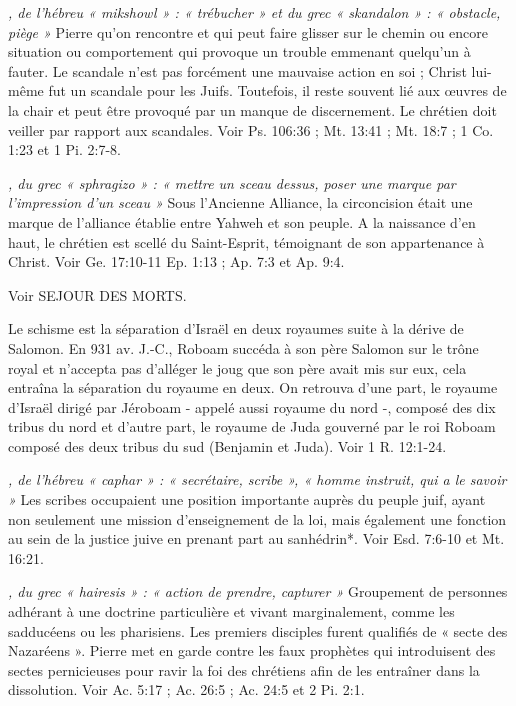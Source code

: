 \begin{multicols}{2}
\textit{, de l'hébreu « mikshowl » : « trébucher » et du grec « skandalon » : « obstacle, piège »}\newline
Pierre qu'on rencontre et qui peut faire glisser sur le chemin ou encore situation ou comportement qui provoque un trouble emmenant quelqu'un à fauter. Le scandale n'est pas forcément une mauvaise action en soi ; Christ lui-même fut un scandale pour les Juifs. Toutefois, il reste souvent lié aux œuvres de la chair et peut être provoqué par un manque de discernement. Le chrétien doit veiller par rapport aux scandales. Voir Ps. 106:36 ; Mt. 13:41 ; Mt. 18:7 ; 1 Co. 1:23 et 1 Pi. 2:7-8.

\textit{, du grec « sphragizo » : « mettre un sceau dessus, poser une marque par l'impression d'un sceau »}\newline
Sous l'Ancienne Alliance, la circoncision était une marque de l'alliance établie entre Yahweh et son peuple. A la naissance d'en haut, le chrétien est scellé du Saint-Esprit, témoignant de son appartenance à Christ. Voir Ge. 17:10-11 Ep. 1:13 ; Ap. 7:3 et Ap. 9:4.

\textit{}\newline
Voir SEJOUR DES MORTS.

\textit{}\newline
Le schisme est la séparation d'Israël en deux royaumes suite à la dérive de Salomon. En 931 av. J.-C., Roboam succéda à son père Salomon sur le trône royal et n'accepta pas d'alléger le joug que son père avait mis sur eux, cela entraîna la séparation du royaume en deux. On retrouva d'une part, le royaume d'Israël dirigé par Jéroboam - appelé aussi royaume du nord -, composé des dix tribus du nord et d'autre part, le royaume de Juda gouverné par le roi Roboam composé des deux tribus du sud (Benjamin et Juda). Voir 1 R. 12:1-24.

\textit{, de l'hébreu « caphar » : « secrétaire, scribe », « homme instruit, qui a le savoir »}\newline
Les scribes occupaient une position importante auprès du peuple juif, ayant non seulement une mission d'enseignement de la loi, mais également une fonction au sein de la justice juive en prenant part au sanhédrin*. Voir Esd. 7:6-10 et Mt. 16:21.

\textit{, du grec « hairesis » : « action de prendre, capturer »}\newline
Groupement de personnes adhérant à une doctrine particulière et vivant marginalement, comme les sadducéens ou les pharisiens. Les premiers disciples furent qualifiés de « secte des Nazaréens ». Pierre met en garde contre les faux prophètes qui introduisent des sectes pernicieuses pour ravir la foi des chrétiens afin de les entraîner dans la dissolution. Voir Ac. 5:17 ; Ac. 26:5 ; Ac. 24:5 et 2 Pi. 2:1.


\end{multicols}
